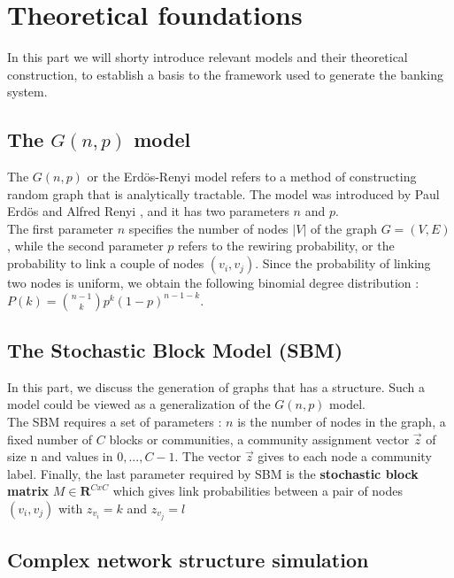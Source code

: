 \documentclass[14pt]{article}
\begin{document}
\section{Theoretical foundations}
In this part we will shorty introduce relevant models and their theoretical construction, to establish a basis to the framework used to generate the banking system.
\subsection{The $G(n,p)$ model}
The $G(n,p)$ or the Erd{\"o}s-Renyi model refers to a method of constructing random graph that is analytically tractable. The model was introduced by Paul Erd{\"o}s and Alfred Renyi \cite{art3}, and it has two parameters $n$ and $p$.
\\The first parameter $n$ specifies the number of nodes $|V|$ of the graph $G=(V,E)$, while the second parameter $p$ refers to the rewiring probability, or the probability to link a couple of nodes $(v_i,v_j)$. Since the probability of linking two nodes is uniform, we obtain the following binomial degree distribution : $P(k) = {n-1\choose k}p^k(1-p)^{n-1-k}$.

\subsection{The Stochastic Block Model (SBM)}
In this part, we discuss the generation of graphs that has a  structure. Such a model could be viewed as a generalization of the $G(n,p)$ model.
\\The SBM requires a set of parameters : $n$ is the number of nodes in the graph, a fixed number of $C$ blocks or communities, a community assignment vector $\Vec{z}$ of size n and values in ${0,...,C-1}$. The vector $\Vec{z}$ gives to each node a community label. Finally, the last parameter required by SBM is the \textbf{stochastic block matrix} $M \in \mathbf{R}^{CxC}$ which gives link probabilities between a pair of nodes $(v_i,v_j)$ with $z_{v_i}=k$ and $z_{v_j}=l$

\subsection{Complex network structure simulation}

\end{document}
